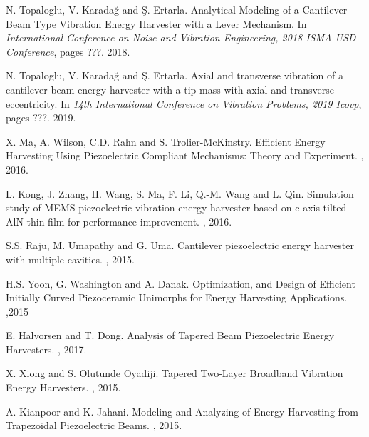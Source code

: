 \documentclass{article}
\begin{document}
\begin{thebibliography}{1}

\bibitem{}
N. Topaloglu, V. Karadağ and Ş. Ertarla.
\newblock Analytical Modeling of a Cantilever Beam Type Vibration Energy Harvester with a Lever Mechanism.
\newblock In {\em International Conference on Noise and Vibration Engineering, 2018 ISMA-USD Conference}, pages ???. 2018.

\bibitem{}
N. Topaloglu, V. Karadağ and Ş. Ertarla.
\newblock Axial and transverse vibration of a cantilever beam energy harvester with a tip mass with axial and transverse eccentricity.
\newblock In {\em 14th International Conference on Vibration Problems, 2019 Icovp}, pages ???. 2019.

\bibitem{}
X. Ma, A. Wilson, C.D. Rahn and  S. Trolier-McKinstry.
\newblock Efficient Energy Harvesting Using Piezoelectric Compliant Mechanisms: Theory and Experiment.
, 2016.

\bibitem{}
L. Kong, J. Zhang, H. Wang, S. Ma, F. Li, Q.-M. Wang and L. Qin.
\newblock Simulation study of MEMS piezoelectric vibration energy harvester based on c-axis tilted AlN thin film for performance improvement.
, 2016.

\bibitem{}
S.S. Raju, M. Umapathy and G. Uma.
\newblock Cantilever piezoelectric energy harvester with multiple cavities.
, 2015.

\bibitem{}
H.S. Yoon, G. Washington and A. Danak.
\newblock Optimization, and Design of Efficient Initially Curved Piezoceramic Unimorphs for Energy Harvesting Applications.
,2015

\bibitem{}
E. Halvorsen and T. Dong.
\newblock Analysis of Tapered Beam Piezoelectric Energy Harvesters.
, 2017.

\bibitem{}
X. Xiong and S. Olutunde Oyadiji.
\newblock Tapered Two-Layer Broadband Vibration Energy Harvesters. 
, 2015.

\bibitem{}
 A. Kianpoor and K. Jahani.
\newblock Modeling and Analyzing of Energy Harvesting from Trapezoidal Piezoelectric Beams.
, 2015.


\end{thebibliography}
\end{document}
